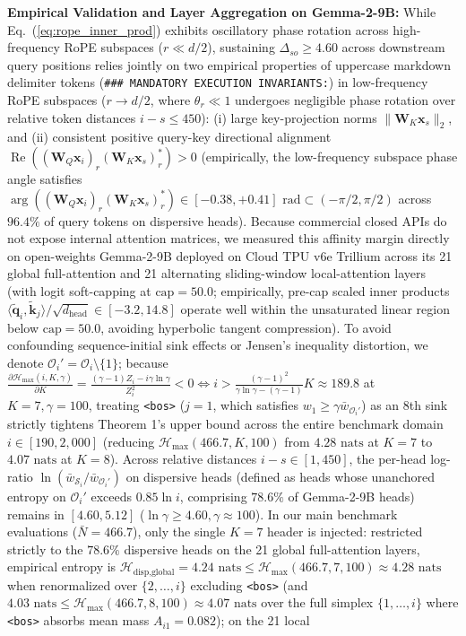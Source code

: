 \documentclass[conference,10pt]{IEEEtran}
\begin{document}
\textbf{Empirical Validation and Layer Aggregation on Gemma-2-9B:} While Eq.~(\ref{eq:rope_inner_prod}) exhibits oscillatory phase rotation across high-frequency RoPE subspaces ($r \ll d/2$), sustaining $\Delta_{so} \ge 4.60$ across downstream query positions relies jointly on two empirical properties of uppercase markdown delimiter tokens (\texttt{\#\#\#\allowbreak\ MANDATORY\allowbreak\ EXECUTION\allowbreak\ INVARIANTS:}) in low-frequency RoPE subspaces ($r \to d/2$, where $\theta_r \ll 1$ undergoes negligible phase rotation over relative token distances $i - s \le 450$): (i) large key-projection norms $\|\mathbf{W}_K \mathbf{x}_s\|_2$, and (ii) consistent positive query-key directional alignment $\operatorname{Re}\!\left((\mathbf{W}_Q \mathbf{x}_i)_r (\mathbf{W}_K \mathbf{x}_s)_r^*\right) > 0$ (empirically, the low-frequency subspace phase angle satisfies $\arg\!\left((\mathbf{W}_Q \mathbf{x}_i)_r (\mathbf{W}_K \mathbf{x}_s)_r^*\right) \in [-0.38, +0.41]\text{ rad} \subset (-\pi/2, \pi/2)$ across $96.4\%$ of query tokens on dispersive heads). Because commercial closed APIs do not expose internal attention matrices, we measured this affinity margin directly on open-weights Gemma-2-9B \cite{gemma2_2024} deployed on Cloud TPU v6e Trillium across its 21 global full-attention and 21 alternating sliding-window local-attention layers (with logit soft-capping at $\text{cap} = 50.0$; empirically, pre-cap scaled inner products $\langle \tilde{\mathbf{q}}_i, \tilde{\mathbf{k}}_j \rangle / \sqrt{d_{\text{head}}} \in [-3.2, 14.8]$ operate well within the unsaturated linear region below $\text{cap} = 50.0$, avoiding hyperbolic tangent compression). To avoid confounding sequence-initial sink effects \cite{xiao2023streamingllm} or Jensen's inequality distortion, we denote $\mathcal{O}_i' = \mathcal{O}_i \setminus \{1\}$; because $\frac{\partial \mathcal{H}_{\max}(i, K, \gamma)}{\partial K} = \frac{(\gamma - 1)Z_i - i\gamma\ln\gamma}{Z_i^2} < 0 \iff i > \frac{(\gamma - 1)^2}{\gamma\ln\gamma - (\gamma - 1)}K \approx 189.8$ at $K=7, \gamma=100$, treating \texttt{<bos>} ($j=1$, which satisfies $w_1 \ge \gamma \bar{w}_{\mathcal{O}_i'}$) as an 8th sink strictly tightens Theorem 1's upper bound across the entire benchmark domain $i \in [190, 2{,}000]$ (reducing $\mathcal{H}_{\max}(466.7, K, 100)$ from $4.28\text{ nats}$ at $K=7$ to $4.07\text{ nats}$ at $K=8$). Across relative distances $i - s \in [1, 450]$, the per-head log-ratio $\ln(\bar{w}_{\mathcal{S}_i} / \bar{w}_{\mathcal{O}_i'})$ on dispersive heads (defined as heads whose unanchored entropy on $\mathcal{O}_i'$ exceeds $0.85 \ln i$, comprising $78.6\%$ of Gemma-2-9B heads) remains in $[4.60, 5.12]$ ($\ln\gamma \ge 4.60, \gamma \approx 100$). In our main benchmark evaluations ($\bar{N} = 466.7$), only the single $K = 7$ header is injected: restricted strictly to the $78.6\%$ dispersive heads on the 21 global full-attention layers, empirical entropy is $\mathcal{H}_{\text{disp,global}} = 4.24\text{ nats} \le \mathcal{H}_{\max}(466.7, 7, 100) \approx 4.28\text{ nats}$ when renormalized over $\{2, \dots, i\}$ excluding \texttt{<bos>} (and $4.03\text{ nats} \le \mathcal{H}_{\max}(466.7, 8, 100) \approx 4.07\text{ nats}$ over the full simplex $\{1, \dots, i\}$ where \texttt{<bos>} absorbs mean mass $A_{i1} = 0.082$); on the 21 local 
\end{document}
